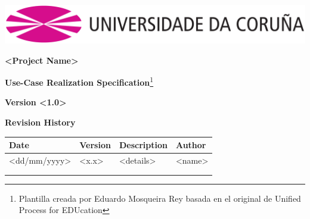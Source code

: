 \documentclass[12pt, a4paper, titlepage]{article}
\begin{document}

\begin{titlepage}

\includegraphics[width=15cm]{Imagenes/Simbolo_logo_UDC.png}

\vspace{6cm}

\begin{flushright}

	\LARGE{\textbf{\textless Project Name\textgreater}}
	
	\LARGE{\textbf{Use-Case Realization Specification}}\footnote{Plantilla creada por Eduardo Mosqueira Rey basada en el original de Unified Process for EDUcation}
	
	\large{\textbf{Version \textless 1.0\textgreater}}
\end{flushright}

\vspace{3cm}
\begin{center}
	\large{\textbf{Revision History}}
	
    \begin{tabular}{ | p{4cm} | p{2cm} | p{5cm} | p{4cm} |}
    \hline
    \textbf{Date} & \textbf{Version} & \textbf{Description} & \textbf{Author} \\ \hline
    \textless dd/mm/yyyy\textgreater & \textless x.x\textgreater & \textless details\textgreater & \textless name\textgreater  \\ \hline
    & & & \\ \hline
    & & & \\ \hline
    \end{tabular}
\end{center}

\end{titlepage}
\clearpage


\tableofcontents
\newpage
\end{document}
